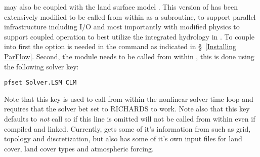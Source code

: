 \parflow{} may also be coupled with the land surface model  \cite{Dai03}.  
This version of  has been extensively modified to be called from within \parflow{} 
as a subroutine, to support parallel infrastructure including I/O and most importantly with modified 
physics to support coupled operation to best utilize the integrated hydrology
 in \parflow{} \cite{MM05, KM08a}.  To couple  into \parflow{} first the
  option is needed in the  command as indicated in \S~\ref{Installing ParFlow}. 
 Second, the  module needs to be called from within \parflow{}, this is done using the following 
 solver key:
\begin{verbatim}
pfset Solver.LSM CLM
\end{verbatim}
Note that this key is used to call  from within the nonlinear solver time loop 
and requires that the solver bet set to RICHARDS to work.  Note also that this key defaults to 
\emph{not} call  so if this line is omitted  will not be called from within 
\parflow{} even if compiled and linked.  Currently,  gets some of it's information from \parflow{} 
such as grid, topology and discretization, but also has some of it's own input files for land cover, land cover
types and atmospheric forcing.
